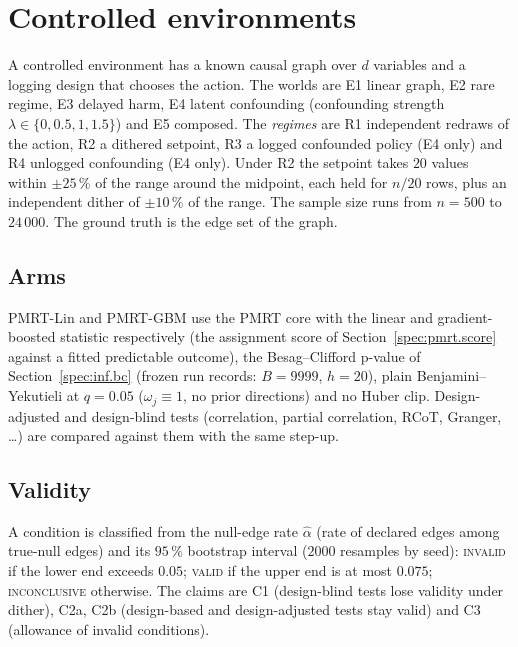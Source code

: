 \section{Controlled environments}
\label{spec:env}

A controlled environment has a known causal graph over $d$ variables and a logging design that chooses the action. The worlds are E1 linear graph, E2 rare regime, E3 delayed harm, E4 latent confounding (confounding strength $\lambda \in \{0, 0.5, 1, 1.5\}$) and E5 composed. The \emph{regimes} are R1 independent redraws of the action, R2 a dithered setpoint, R3 a logged confounded policy (E4 only) and R4 unlogged confounding (E4 only). Under R2 the setpoint takes $20$ values within $\pm 25\,\%$ of the range around the midpoint, each held for $n/20$ rows, plus an independent dither of $\pm 10\,\%$ of the range. The sample size runs from $n = 500$ to $24\,000$. The ground truth is the edge set of the graph.


\subsection{Arms}
\label{spec:env.arms}

PMRT-Lin and PMRT-GBM use the PMRT core with the linear and gradient-boosted statistic respectively (the assignment score of Section~\ref{spec:pmrt.score} against a fitted predictable outcome), the Besag--Clifford p-value of Section~\ref{spec:inf.bc} (frozen run records: $B = 9999$, $h = 20$), plain Benjamini--Yekutieli at $q = 0.05$ ($\omega_j \equiv 1$, no prior directions) and no Huber clip. Design-adjusted and design-blind tests (correlation, partial correlation, RCoT, Granger, \dots) are compared against them with the same step-up.


\subsection{Validity}
\label{spec:env.validity}

A condition is classified from the null-edge rate $\hat\alpha$ (rate of declared edges among true-null edges) and its $95\,\%$ bootstrap interval ($2000$ resamples by seed): \textsc{invalid} if the lower end exceeds $0.05$; \textsc{valid} if the upper end is at most $0.075$; \textsc{inconclusive} otherwise. The claims are C1 (design-blind tests lose validity under dither), C2a, C2b (design-based and design-adjusted tests stay valid) and C3 (allowance of invalid conditions).

